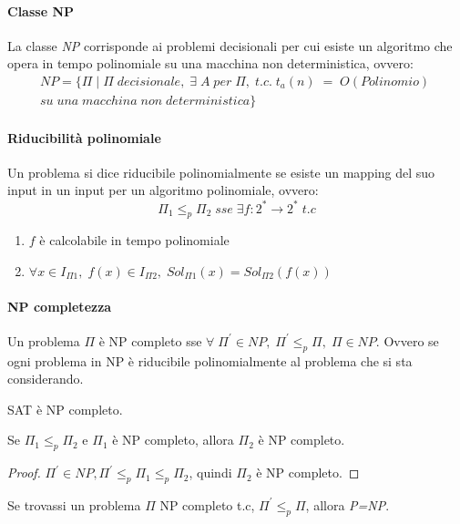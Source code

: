 \paragraph{Classe NP}
La classe \emph{NP} corrisponde ai problemi decisionali 
per cui esiste un algoritmo che opera
in tempo polinomiale su una macchina non deterministica, ovvero: 
\begin{equation}
    \begin{aligned}
        NP = \{\Pi\;|\;\Pi\;decisionale, \; \exists\;A\;per\;\Pi,\; t.c.\;t_a(n)\;=\;O(Polinomio)\;
        \\su\;una\;macchina\;non\;deterministica\}
    \end{aligned}
\end{equation}

\paragraph{Riducibilità polinomiale}
Un problema si dice riducibile polinomialmente se esiste un mapping del suo 
input in un input per un algoritmo polinomiale, ovvero:
$$\Pi_1 \leqslant _p \Pi_2 \;sse\; \exists f : 2^* \rightarrow 2^*\; t.c$$
\begin{enumerate}
    \item $f$ è calcolabile in tempo polinomiale
    \item $\forall x \in I_{\Pi1},\;f(x) \in I_{\Pi2},\; Sol_{\Pi1}(x) = Sol_{\Pi2}(f(x))$ 
\end{enumerate}

\paragraph{NP completezza}
Un problema $\Pi$ è NP completo sse $\forall\;\Pi^\prime \in NP,\; \Pi^\prime \leqslant _p \Pi, \; \Pi \in NP$.
Ovvero se ogni problema in NP è riducibile polinomialmente al problema che si sta 
considerando.

\begin{theorem}
    SAT è NP completo.
\end{theorem}
\begin{corollary}
    Se $\Pi_1 \leqslant _p \Pi_2$ e $\Pi_1$ è NP completo, allora $\Pi_2$ è NP completo.
\end{corollary}
\begin{proof}
    $\Pi^\prime \in NP, \Pi^\prime \leqslant _p \Pi_1 \leqslant _p \Pi_2$, quindi $\Pi_2$ è NP completo.
\end{proof}
\begin{remark}
    Se trovassi un problema $\Pi$ NP completo t.c, $\Pi^\prime \leqslant _p \Pi$, 
    allora \emph{P=NP}.
\end{remark}

